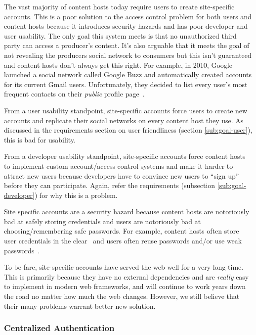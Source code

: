 \documentclass[pdftex,12pt,a4papaer,twoside,notitlepage]{report}
\begin{document}
The vast majority of content hosts today require users to create site-specific
accounts. This is a poor solution to the access control problem for both users
and content hosts because it introduces security hazards and has poor developer
and user usability. The only goal this system meets is that no unauthorized
third party can access a producer's content. It's also arguable that it meets
the goal of not revealing the producers social network to consumers but this
isn't guaranteed and content hosts don't always get this right. For example, in
2010, Google launched a social network called Google Buzz and automatically
created accounts for its current Gmail users. Unfortunately, they decided to
list every user's most frequent contacts on their \emph{public} profile
page~\cite{google-buzz}.

From a user usability standpoint, site-specific accounts force users to create
new accounts and replicate their social networks on every content host they use.
As discussed in the requirements section on user friendliness (section
\ref{sub:goal-user}), this is bad for usability.

From a developer usability standpoint, site-specific accounts force content
hosts to implement custom account/access control systems and make it harder to
attract new users because developers have to convince new users to ``sign up''
before they can participate. Again, refer the requirements (subsection
\ref{sub:goal-developer}) for why this is a problem.

Site specific accounts are a security hazard because content hosts are
notoriously bad at safely storing credentials and users are notoriously bad at
choosing/remembering safe passwords. For example, content hosts often store user
credentials in the clear~\cite{plaintext} and users often reuse passwords and/or
use weak passwords~\cite{ms-passwords}.

To be fare, site-specific accounts have served the web well for a very long
time. This is primarily because they have no external dependencies and are
\emph{really} easy to implement in modern web frameworks, and will continue to
work years down the road no matter how much the web changes. However, we still
believe that their many problems warrant better new solution.

\subsubsection{Centralized Authentication}
\end{document}
